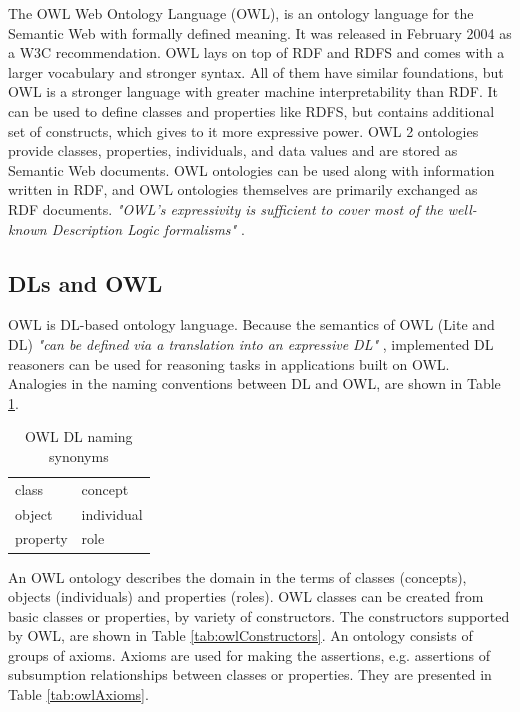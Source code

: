 The OWL Web Ontology Language (OWL), is an ontology language for the Semantic Web with formally defined meaning. It was released in February 2004 as a W3C recommendation. OWL lays on top of RDF and RDFS and comes with a larger vocabulary and stronger syntax. All of them have similar foundations, but OWL is a stronger language with greater machine interpretability than RDF. It can be used to define classes and properties like RDFS, but contains additional set of constructs, which gives to it more expressive power. OWL 2 ontologies provide classes, properties, individuals, and data values and are stored as Semantic Web documents. OWL ontologies can be used along with information written in RDF, and OWL ontologies themselves are primarily exchanged as RDF documents. \textit{"OWL's expressivity is sufficient to cover most of the well-known Description Logic formalisms"} \cite{HLP08, W3COWL}.

\subsection{DLs and OWL}
\label{sub:dlsAndOwl}

OWL is DL-based ontology language. Because the semantics of OWL (Lite and DL) \textit{"can be defined via a translation into an expressive DL"} \cite{HLP08}, implemented DL reasoners can be used for reasoning tasks in applications built on OWL. Analogies in the naming conventions between DL and OWL, are shown in Table \ref{tab:naming}.

\medskip

\begin{table}[htp]
\centering
\begin{tabular}{ |>{\centering\arraybackslash}m{2cm}|>{\centering\arraybackslash}m{2cm}| }
    \hline
    \multicolumn{1}{|c|}{\textbf{OWL}}  &	\multicolumn{1}{c|}{\textbf{DL}} \\ \hline
    class                               &	concept \\ \hline
    object                              &	individual \\ \hline
    property                            &	role \\ \hline
\end{tabular}
\caption{OWL DL naming synonyms}
\label{tab:naming}
\end{table}

\newpage

\noindent An OWL ontology describes the domain in the terms of classes (concepts), objects (individuals) and properties (roles). OWL classes can be created from basic classes or properties, by variety of constructors. The constructors supported by OWL, are shown in Table \ref{tab:owlConstructors}. An ontology consists of groups of axioms. Axioms are used for making the assertions, e.g. assertions of subsumption relationships between classes or properties. They are presented in Table \ref{tab:owlAxioms}.

